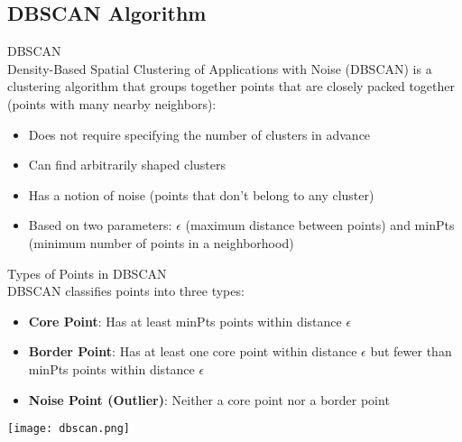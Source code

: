 \subsection{DBSCAN Algorithm}

\begin{definition}{DBSCAN}\\
Density-Based Spatial Clustering of Applications with Noise (DBSCAN) is a clustering algorithm that groups together points that are closely packed together (points with many nearby neighbors):
\begin{itemize}
    \item Does not require specifying the number of clusters in advance
    \item Can find arbitrarily shaped clusters
    \item Has a notion of noise (points that don't belong to any cluster)
    \item Based on two parameters: $\epsilon$ (maximum distance between points) and minPts (minimum number of points in a neighborhood)
\end{itemize}
\end{definition}


\begin{definition}{Types of Points in DBSCAN}\\
DBSCAN classifies points into three types:
\begin{itemize}
    \item \textbf{Core Point}: Has at least minPts points within distance $\epsilon$
    \item \textbf{Border Point}: Has at least one core point within distance $\epsilon$ but fewer than minPts points within distance $\epsilon$
    \item \textbf{Noise Point (Outlier)}: Neither a core point nor a border point
\end{itemize}
\end{definition}

\texttt{[image: dbscan.png]}

\multend


